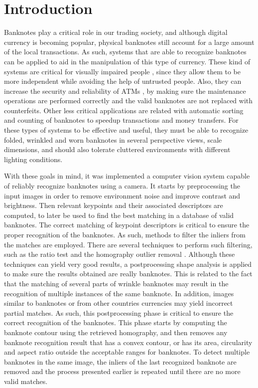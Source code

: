 \section{Introduction}\label{sec:introduction}

Banknotes play a critical role in our trading society, and although digital currency is becoming popular, physical banknotes still account for a large amount of the local transactions. As such, systems that are able to recognize banknotes can be applied to aid in the manipulation of this type of currency. These kind of systems are critical for visually impaired people \cite{Hasanuzzaman2012}, since they allow them to be more independent while avoiding the help of untrusted people. Also, they can increase the security and reliability of ATMs \cite{Sako2007}, by making sure the maintenance operations are performed correctly and the valid banknotes are not replaced with counterfeits. Other less critical applications are related with automatic sorting and counting of banknotes to speedup transactions and money transfers. For these types of systems to be effective and useful, they must be able to recognize folded, wrinkled and worn banknotes in several perspective views, scale dimensions, and should also tolerate cluttered environments with different lighting conditions.

With these goals in mind, it was implemented a computer vision system capable of reliably recognize banknotes using a camera. It starts by preprocessing the input images in order to remove environment noise and improve contrast and brightness. Then relevant keypoints and their associated descriptors are computed, to later be used to find the best matching in a database of valid banknotes. The correct matching of keypoint descriptors is critical to ensure the proper recognition of the banknotes. As such, methods to filter the inliers from the matches are employed. There are several techniques to perform such filtering, such as the ratio test \cite{Lowe2004} and the homography outlier removal \cite{Baggio2012}. Although these techniques can yield very good results, a postprocessing shape analysis is applied to make sure the results obtained are really banknotes. This is related to the fact that the matching of several parts of wrinkle banknotes may result in the recognition of multiple instances of the same banknote. In addition, images similar to banknotes or from other countries currencies may yield incorrect partial matches. As such, this postprocessing phase is critical to ensure the correct recognition of the banknotes. This phase starts by computing the banknote contour using the retrieved homography, and then removes any banknote recognition result that has a convex contour, or has its area, circularity and aspect ratio outside the acceptable ranges for banknotes. To detect multiple banknotes in the same image, the inliers of the last recognized banknote are removed and the process presented earlier is repeated until there are no more valid matches.

